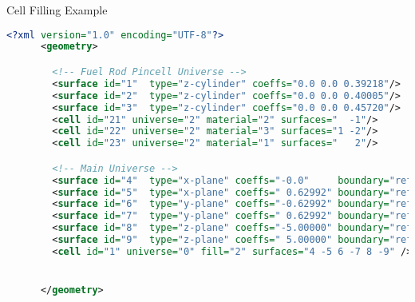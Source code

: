 \begin{frame}[fragile]{Cell Filling Example}


  \begin{scriptsize}
    \begin{lstlisting}[language=XML,gobble=4]
      <?xml version="1.0" encoding="UTF-8"?>
      <geometry>

        <!-- Fuel Rod Pincell Universe -->
        <surface id="1"  type="z-cylinder" coeffs="0.0 0.0 0.39218"/>     <!-- fuel OR   -->
        <surface id="2"  type="z-cylinder" coeffs="0.0 0.0 0.40005"/>     <!-- gap OR    -->
        <surface id="3"  type="z-cylinder" coeffs="0.0 0.0 0.45720"/>     <!-- clad OR   -->
        <cell id="21" universe="2" material="2" surfaces="  -1"/>         <!-- fuel  -->
        <cell id="22" universe="2" material="3" surfaces="1 -2"/>         <!-- clad  -->
        <cell id="23" universe="2" material="1" surfaces="   2"/>         <!-- water -->

        <!-- Main Universe -->
        <surface id="4"  type="x-plane" coeffs="-0.0"     boundary="reflective"/>
        <surface id="5"  type="x-plane" coeffs=" 0.62992" boundary="reflective"/>
        <surface id="6"  type="y-plane" coeffs="-0.62992" boundary="reflective"/>
        <surface id="7"  type="y-plane" coeffs=" 0.62992" boundary="reflective"/>
        <surface id="8"  type="z-plane" coeffs="-5.00000" boundary="reflective"/>
        <surface id="9"  type="z-plane" coeffs=" 5.00000" boundary="reflective"/>
        <cell id="1" universe="0" fill="2" surfaces="4 -5 6 -7 8 -9" />


      </geometry>
    \end{lstlisting}
  \end{scriptsize}

  \centering

\end{frame}


